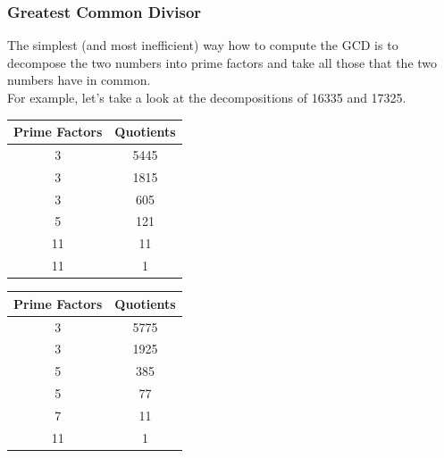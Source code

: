 \documentclass[aspectratio=169,11pt,usenames,dvipsnames,handout]{beamer}
\begin{document}
\begin{frame}
 \frametitle{Greatest Common Divisor}
 The simplest (and most inefficient) way how to compute the GCD is to decompose
 the two numbers into prime factors and take all those that the two numbers have
 in common.\\
 \pause
 For example, let's take a look at the decompositions of 16335 and 17325.\\
 \vspace{1em}
 \centering
 \begin{minipage}{.48\textwidth}
  \centering
   \begin{tabular}{c|c}
    \textbf{Prime Factors} & \textbf{Quotients}\\
    \toprule
    3 & 5445\\
    3 & 1815\\
    3 & 605\\
    5 & 121\\
    11 & 11\\
    11 & 1
  \end{tabular}
 \end{minipage}
 \begin{minipage}{.48\textwidth}
   \begin{tabular}{c|c}
    \textbf{Prime Factors} & \textbf{Quotients}\\
    \toprule
    3 & 5775\\
    3 & 1925\\
    5 & 385\\
    5 & 77\\
    7 & 11\\
    11 & 1
  \end{tabular}
 \end{minipage}
\end{frame}
\end{document}

